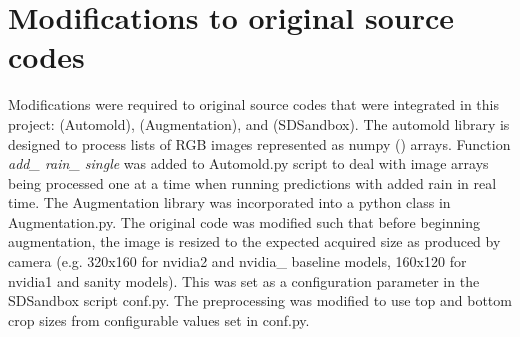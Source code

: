 


\section{Modifications to original source codes}
Modifications were required to original source codes that were integrated in this project: \cite{Saxena2017} (Automold), \cite{Naoki2016} (Augmentation), and \cite{SDSandboxSim} (SDSandbox). The automold library is designed to process lists of RGB images represented as numpy (\cite{harris2020array}) arrays. Function \textit{add\_ rain\_ single} was added to Automold.py script to deal with image arrays being processed one at a time when running predictions with added rain in real time. The Augmentation library was incorporated into a python class in Augmentation.py. The original code was modified such that before beginning augmentation, the image is resized to the expected acquired size as produced by camera (e.g. 320x160 for nvidia2 and nvidia\_ baseline models, 160x120 for nvidia1 and sanity models). This was set as a configuration parameter in the SDSandbox script conf.py. The preprocessing was modified to use top and bottom crop sizes from configurable values set in conf.py.  
 

